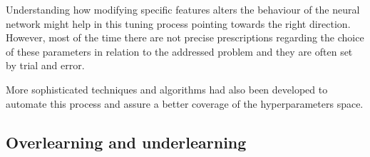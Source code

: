 \documentclass[a4paper,10pt]{report}
\begin{document}
Understanding how modifying specific features alters the behaviour of the neural 
network might help in this tuning process pointing towards the right direction.
However, most of the time there are not precise prescriptions regarding the choice of these parameters
in relation to the addressed problem and they are often set by trial and error.

More sophisticated techniques and algorithms had also been developed to automate this process and 
assure a better coverage of the hyperparameters space.

\subsection{Overlearning and underlearning}

\end{document}
